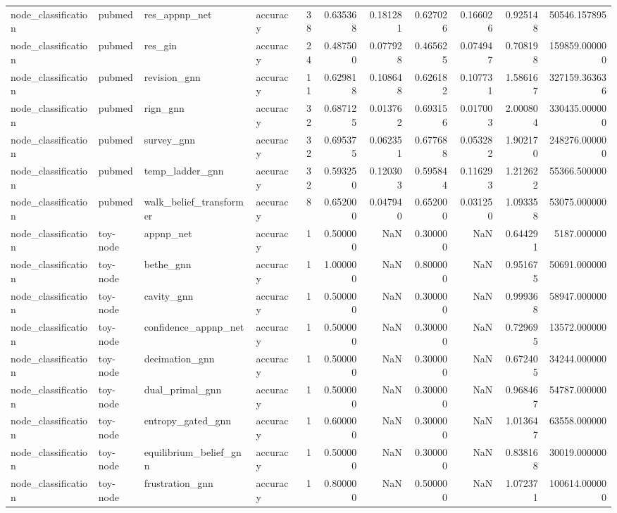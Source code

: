 \begin{tabular}{llllrrrrrrr}
node_classification & pubmed & res_appnp_net & accuracy & 38 & 0.635368 & 0.181281 & 0.627026 & 0.166026 & 0.925148 & 50546.157895 \\
node_classification & pubmed & res_gin & accuracy & 24 & 0.487500 & 0.077928 & 0.465625 & 0.074947 & 0.708198 & 159859.000000 \\
node_classification & pubmed & revision_gnn & accuracy & 11 & 0.629818 & 0.108648 & 0.626182 & 0.107731 & 1.586167 & 327159.363636 \\
node_classification & pubmed & rign_gnn & accuracy & 32 & 0.687125 & 0.013762 & 0.693156 & 0.017003 & 2.000804 & 330435.000000 \\
node_classification & pubmed & survey_gnn & accuracy & 32 & 0.695375 & 0.062351 & 0.677688 & 0.053282 & 1.902170 & 248276.000000 \\
node_classification & pubmed & temp_ladder_gnn & accuracy & 32 & 0.593250 & 0.120303 & 0.595844 & 0.116293 & 1.212622 & 55366.500000 \\
node_classification & pubmed & walk_belief_transformer & accuracy & 8 & 0.652000 & 0.047940 & 0.652000 & 0.031250 & 1.093358 & 53075.000000 \\
node_classification & toy-node & appnp_net & accuracy & 1 & 0.500000 & NaN & 0.300000 & NaN & 0.644291 & 5187.000000 \\
node_classification & toy-node & bethe_gnn & accuracy & 1 & 1.000000 & NaN & 0.800000 & NaN & 0.951675 & 50691.000000 \\
node_classification & toy-node & cavity_gnn & accuracy & 1 & 0.500000 & NaN & 0.300000 & NaN & 0.999368 & 58947.000000 \\
node_classification & toy-node & confidence_appnp_net & accuracy & 1 & 0.500000 & NaN & 0.300000 & NaN & 0.729695 & 13572.000000 \\
node_classification & toy-node & decimation_gnn & accuracy & 1 & 0.500000 & NaN & 0.300000 & NaN & 0.672405 & 34244.000000 \\
node_classification & toy-node & dual_primal_gnn & accuracy & 1 & 0.500000 & NaN & 0.300000 & NaN & 0.968467 & 54787.000000 \\
node_classification & toy-node & entropy_gated_gnn & accuracy & 1 & 0.600000 & NaN & 0.300000 & NaN & 1.013647 & 63558.000000 \\
node_classification & toy-node & equilibrium_belief_gnn & accuracy & 1 & 0.500000 & NaN & 0.300000 & NaN & 0.838168 & 30019.000000 \\
node_classification & toy-node & frustration_gnn & accuracy & 1 & 0.800000 & NaN & 0.500000 & NaN & 1.072371 & 100614.000000 \\

\end{tabular}
